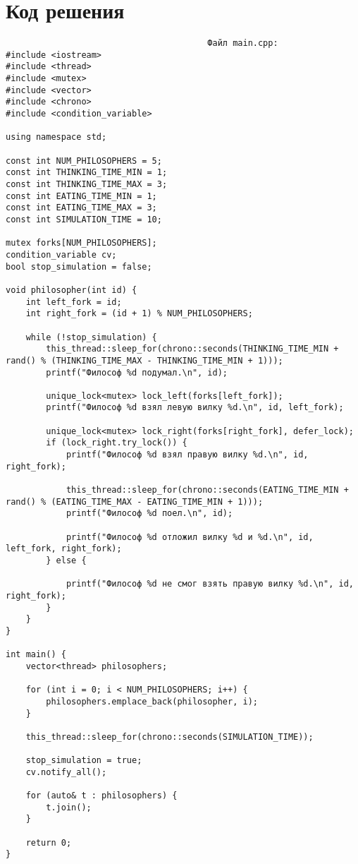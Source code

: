\documentclass[a4paper, 14pt]{extarticle}
\begin{document}
\section{Код решения}
\begin{verbatim}
                                        Файл main.cpp:
#include <iostream>
#include <thread>
#include <mutex>
#include <vector>
#include <chrono>
#include <condition_variable>

using namespace std;

const int NUM_PHILOSOPHERS = 5;
const int THINKING_TIME_MIN = 1;
const int THINKING_TIME_MAX = 3;
const int EATING_TIME_MIN = 1;
const int EATING_TIME_MAX = 3;
const int SIMULATION_TIME = 10;

mutex forks[NUM_PHILOSOPHERS];
condition_variable cv;
bool stop_simulation = false;

void philosopher(int id) {
    int left_fork = id;
    int right_fork = (id + 1) % NUM_PHILOSOPHERS;

    while (!stop_simulation) {
        this_thread::sleep_for(chrono::seconds(THINKING_TIME_MIN + rand() % (THINKING_TIME_MAX - THINKING_TIME_MIN + 1)));
        printf("Философ %d подумал.\n", id);

        unique_lock<mutex> lock_left(forks[left_fork]);
        printf("Философ %d взял левую вилку %d.\n", id, left_fork);

        unique_lock<mutex> lock_right(forks[right_fork], defer_lock);
        if (lock_right.try_lock()) {
            printf("Философ %d взял правую вилку %d.\n", id, right_fork);

            this_thread::sleep_for(chrono::seconds(EATING_TIME_MIN + rand() % (EATING_TIME_MAX - EATING_TIME_MIN + 1)));
            printf("Философ %d поел.\n", id);

            printf("Философ %d отложил вилку %d и %d.\n", id, left_fork, right_fork);
        } else {

            printf("Философ %d не смог взять правую вилку %d.\n", id, right_fork);
        }
    }
}

int main() {
    vector<thread> philosophers;

    for (int i = 0; i < NUM_PHILOSOPHERS; i++) {
        philosophers.emplace_back(philosopher, i);
    }

    this_thread::sleep_for(chrono::seconds(SIMULATION_TIME));

    stop_simulation = true;
    cv.notify_all();

    for (auto& t : philosophers) {
        t.join();
    }

    return 0;
}
\end{verbatim}
\end{document}
